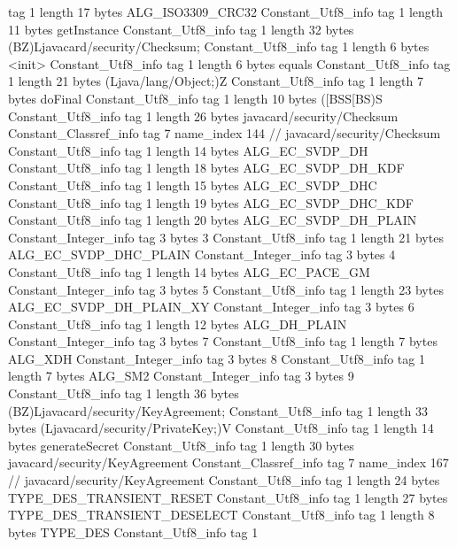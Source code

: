 {{{			tag	1
			length	17
			bytes	ALG_ISO3309_CRC32
		}
		Constant_Utf8_info {
			tag	1
			length	11
			bytes	getInstance
		}
		Constant_Utf8_info {
			tag	1
			length	32
			bytes	(BZ)Ljavacard/security/Checksum;
		}
		Constant_Utf8_info {
			tag	1
			length	6
			bytes	<init>
		}
		Constant_Utf8_info {
			tag	1
			length	6
			bytes	equals
		}
		Constant_Utf8_info {
			tag	1
			length	21
			bytes	(Ljava/lang/Object;)Z
		}
		Constant_Utf8_info {
			tag	1
			length	7
			bytes	doFinal
		}
		Constant_Utf8_info {
			tag	1
			length	10
			bytes	([BSS[BS)S
		}
		Constant_Utf8_info {
			tag	1
			length	26
			bytes	javacard/security/Checksum
		}
		Constant_Classref_info {
			tag	7
			name_index	144		// javacard/security/Checksum
		}
		Constant_Utf8_info {
			tag	1
			length	14
			bytes	ALG_EC_SVDP_DH
		}
		Constant_Utf8_info {
			tag	1
			length	18
			bytes	ALG_EC_SVDP_DH_KDF
		}
		Constant_Utf8_info {
			tag	1
			length	15
			bytes	ALG_EC_SVDP_DHC
		}
		Constant_Utf8_info {
			tag	1
			length	19
			bytes	ALG_EC_SVDP_DHC_KDF
		}
		Constant_Utf8_info {
			tag	1
			length	20
			bytes	ALG_EC_SVDP_DH_PLAIN
		}
		Constant_Integer_info {
			tag	3
			bytes	3
		}
		Constant_Utf8_info {
			tag	1
			length	21
			bytes	ALG_EC_SVDP_DHC_PLAIN
		}
		Constant_Integer_info {
			tag	3
			bytes	4
		}
		Constant_Utf8_info {
			tag	1
			length	14
			bytes	ALG_EC_PACE_GM
		}
		Constant_Integer_info {
			tag	3
			bytes	5
		}
		Constant_Utf8_info {
			tag	1
			length	23
			bytes	ALG_EC_SVDP_DH_PLAIN_XY
		}
		Constant_Integer_info {
			tag	3
			bytes	6
		}
		Constant_Utf8_info {
			tag	1
			length	12
			bytes	ALG_DH_PLAIN
		}
		Constant_Integer_info {
			tag	3
			bytes	7
		}
		Constant_Utf8_info {
			tag	1
			length	7
			bytes	ALG_XDH
		}
		Constant_Integer_info {
			tag	3
			bytes	8
		}
		Constant_Utf8_info {
			tag	1
			length	7
			bytes	ALG_SM2
		}
		Constant_Integer_info {
			tag	3
			bytes	9
		}
		Constant_Utf8_info {
			tag	1
			length	36
			bytes	(BZ)Ljavacard/security/KeyAgreement;
		}
		Constant_Utf8_info {
			tag	1
			length	33
			bytes	(Ljavacard/security/PrivateKey;)V
		}
		Constant_Utf8_info {
			tag	1
			length	14
			bytes	generateSecret
		}
		Constant_Utf8_info {
			tag	1
			length	30
			bytes	javacard/security/KeyAgreement
		}
		Constant_Classref_info {
			tag	7
			name_index	167		// javacard/security/KeyAgreement
		}
		Constant_Utf8_info {
			tag	1
			length	24
			bytes	TYPE_DES_TRANSIENT_RESET
		}
		Constant_Utf8_info {
			tag	1
			length	27
			bytes	TYPE_DES_TRANSIENT_DESELECT
		}
		Constant_Utf8_info {
			tag	1
			length	8
			bytes	TYPE_DES
		}
		Constant_Utf8_info {
			tag	1
}}}
